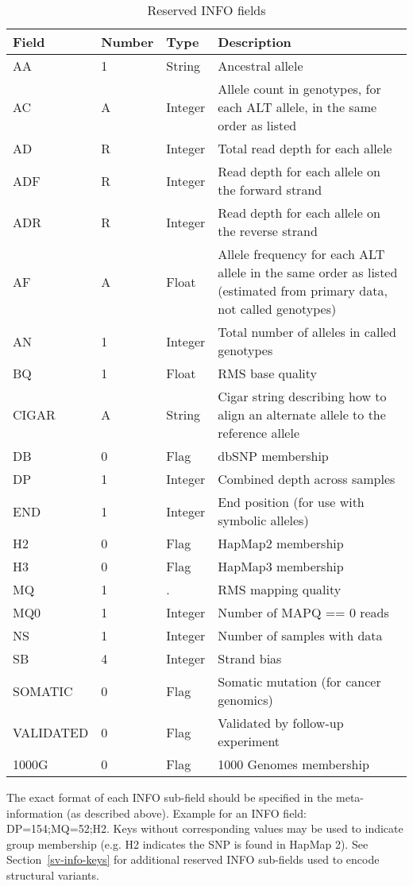 \documentclass[8pt]{article}
\begin{document}
\begin{enumerate}
  \begin{table}[htbp]
    \centering
    \begin{tabularx}{\textwidth}{ | p{2.5cm} | p{1.5cm} | p{1.5cm} | X | }
	Field		& Number	& Type		& Description \\ \hline
	AA		& 1		& String	& Ancestral allele \\
	AC		& A		& Integer	& Allele count in genotypes, for each ALT allele, in the same order as listed  \\
	AD		& R		& Integer	& Total read depth for each allele \\
	ADF		& R		& Integer	& Read depth for each allele on the forward strand \\
	ADR		& R		& Integer	& Read depth for each allele on the reverse strand \\
	AF		& A		& Float		& Allele frequency for each ALT allele in the same order as listed (estimated from primary data, not called genotypes) \\
	AN		& 1		& Integer	& Total number of alleles in called genotypes \\
	BQ   		& 1		& Float		& RMS base quality \\
	CIGAR		& A		& String	& Cigar string describing how to align an alternate allele to the reference allele \\
	DB		& 0		& Flag		& dbSNP membership \\
	DP		& 1		& Integer	& Combined depth across samples \\
	END		& 1		& Integer	& End position (for use with symbolic alleles) \\
	H2		& 0		& Flag		& HapMap2 membership \\
	H3		& 0		& Flag		& HapMap3 membership \\
	MQ		& 1		& .		& RMS mapping quality \\
	MQ0   		& 1		& Integer	& Number of MAPQ == 0 reads \\
	NS		& 1		& Integer	& Number of samples with data \\
	SB		& 4		& Integer	& Strand bias \\
	SOMATIC		& 0		& Flag		& Somatic mutation (for cancer genomics) \\
	VALIDATED	& 0		& Flag		& Validated by follow-up experiment \\
	1000G		& 0		& Flag		& 1000 Genomes membership \\
    \end{tabularx}
    \caption{Reserved INFO fields}
    \label{table:reserved-info}
  \end{table}

  The exact format of each INFO sub-field should be specified in the meta-information (as described above).
  Example for an INFO field: DP=154;MQ=52;H2. Keys without corresponding values may be used to indicate group membership (e.g. H2 indicates the SNP is found in HapMap 2). See Section~\ref{sv-info-keys} for additional reserved INFO sub-fields used to encode structural variants.
\end{enumerate}
\end{document}
